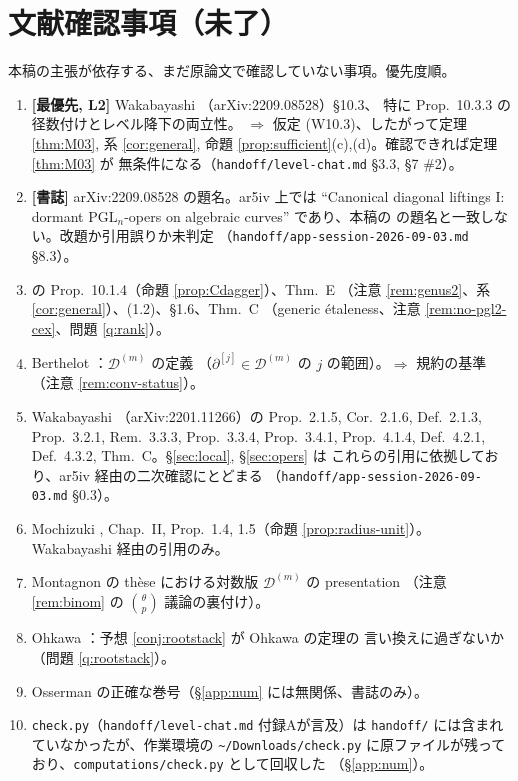 \documentclass[a4paper,11pt]{ltjsarticle}
\theoremstyle{plain}
\theoremstyle{definition}
\newcommand{\cD}{\mathcal{D}}
\begin{document}
\section{文献確認事項（未了）}\label{app:litcheck}

本稿の主張が依存する、まだ原論文で確認していない事項。優先度順。

\begin{enumerate}[leftmargin=1.8em]
\item \textbf{[最優先, L2]} Wakabayashi \cite{Wak2}（arXiv:2209.08528）\S10.3、
      特に Prop.~10.3.3 の径数付けとレベル降下の両立性。
      $\Rightarrow$ 仮定 (W10.3)、したがって定理 \ref{thm:M03}, 系 \ref{cor:general},
      命題 \ref{prop:sufficient}(c),(d)。確認できれば定理 \ref{thm:M03} が
      無条件になる（\texttt{handoff/level-chat.md} \S3.3, \S7 \#2）。
\item \textbf{[書誌]} arXiv:2209.08528 の題名。ar5iv 上では
      ``Canonical diagonal liftings I: dormant $\mathrm{PGL}_n$-opers on algebraic curves''
      であり、本稿の \cite{Wak2} の題名と一致しない。改題か引用誤りか未判定
      （\texttt{handoff/app-session-2026-09-03.md} \S8.3）。
\item \cite{Wak2} の Prop.~10.1.4（命題 \ref{prop:Cdagger}）、Thm.~E
      （注意 \ref{rem:genus2}、系 \ref{cor:general}）、(1.2)、\S1.6、Thm.~C
      （generic étaleness、注意 \ref{rem:no-pgl2-cex}、問題 \ref{q:rank}）。
\item Berthelot \cite[\S1.1--1.2]{Ber1}：$\cD^{(m)}$ の定義
      （$\partial^{[j]}\in\cD^{(m)}$ の $j$ の範囲）。$\Rightarrow$ 規約の基準
      （注意 \ref{rem:conv-status}）。
\item Wakabayashi \cite{Wak}（arXiv:2201.11266）の Prop.~2.1.5, Cor.~2.1.6,
      Def.~2.1.3, Prop.~3.2.1, Rem.~3.3.3, Prop.~3.3.4, Prop.~3.4.1, Prop.~4.1.4,
      Def.~4.2.1, Def.~4.3.2, Thm.~C。\S\ref{sec:local}, \S\ref{sec:opers} は
      これらの引用に依拠しており、ar5iv 経由の二次確認にとどまる
      （\texttt{handoff/app-session-2026-09-03.md} \S0.3）。
\item Mochizuki \cite{Moc}, Chap.~II, Prop.~1.4, 1.5（命題 \ref{prop:radius-unit}）。
      Wakabayashi 経由の引用のみ。
\item Montagnon \cite{Mon} の thèse における対数版 $\cD^{(m)}$ の presentation
      （注意 \ref{rem:binom} の $\binom{\theta}{p}$ 議論の裏付け）。
\item Ohkawa \cite{Ohk}：予想 \ref{conj:rootstack} が Ohkawa の定理の
      言い換えに過ぎないか（問題 \ref{q:rootstack}）。
\item Osserman \cite{Oss} の正確な巻号（\S\ref{app:num} には無関係、書誌のみ）。
\item \texttt{check.py}（\texttt{handoff/level-chat.md} 付録Aが言及）は \texttt{handoff/}
      には含まれていなかったが、作業環境の \texttt{\~{}/Downloads/check.py}
      に原ファイルが残っており、\texttt{computations/check.py} として回収した
      （\S\ref{app:num}）。
\end{enumerate}
\end{document}
